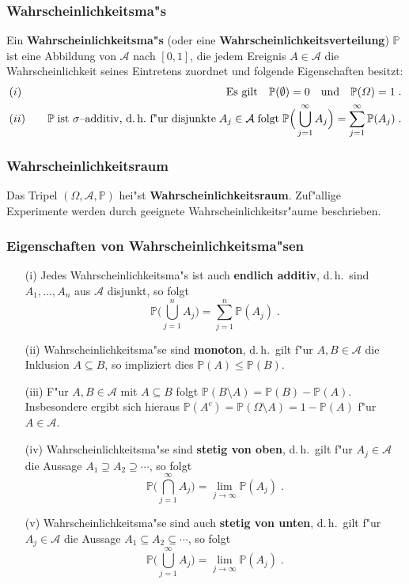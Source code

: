 \documentclass[ngerman,draft,parskip=half,twoside]{scrartcl}
\newcommand*{\Algeb}{\mathcal{A}}   %
\newcommand*{\WKM}{\mathbb{P}}      %
\begin{document}
\subsubsection{Wahrscheinlichkeitsma"s}
Ein \textbf{Wahrscheinlichkeitsma"s} (oder eine \textbf{Wahrscheinlichkeitsverteilung})
 $\WKM$ ist eine Abbildung von
$\Algeb$ nach $[0,1]$, die jedem Ereignis $A\in \Algeb$ die Wahrscheinlichkeit seines
Eintretens zuordnet und folgende Eigenschaften besitzt$\colon$
\begin{eqnarray*}
&(i)&\quad\mbox{Es gilt}\quad \WKM(\emptyset)=0\quad\mbox{und}\quad \WKM(\Omega)=1\;.\\
&(ii)&\quad
\WKM\;\mbox{ist $\sigma$--additiv, d.\,h.~f"ur disjunkte}\;A_j\in\Algeb\;\mbox{folgt}\;
\WKM\Big(\bigcup_{j=1}^\infty A_j\Big)=\sum_{j=1}^\infty\WKM(A_j)\;.
\end{eqnarray*}
\subsubsection{Wahrscheinlichkeitsraum}
Das Tripel $(\Omega,\Algeb,\WKM)$ hei"st \textbf{Wahrscheinlichkeitsraum}. Zuf"allige
Experimente werden durch geeignete Wahrscheinlichkeitsr"aume  beschrieben.
\subsubsection{Eigenschaften von Wahrscheinlichkeitsma"sen}
\begin{enumerate}
\item[\rm(i)]
Jedes Wahrscheinlichkeitsma"s ist auch \textbf{endlich additiv}, d.\,h.~sind
$A_1,\ldots,A_n$ aus $\Algeb$ disjunkt, so folgt
$$
\WKM\Big(\bigcup_{j=1}^n A_j\Big)=\sum_{j=1}^n\WKM(A_j)\;.
$$
\item[\rm(ii)]
Wahrscheinlichkeitsma"se sind \textbf{monoton}, d.\,h.~gilt f"ur $A,B\in\Algeb$ die Inklusion
$A\subseteq B$, so impliziert dies $\WKM(A)\le\WKM(B)$.
\item[\rm(iii)]
F"ur $A,B\in\Algeb$ mit $A\subseteq B$ folgt $\WKM(B\setminus A)=\WKM(B)-\WKM(A)$. Insbesondere ergibt sich hieraus
$\WKM(A^c)=\WKM(\Omega\setminus A)=1-\WKM(A)$ f"ur $A\in\Algeb$.
\item[\rm(iv)]
Wahrscheinlichkeitsma"se sind \textbf{stetig von oben}, d.\,h.~gilt f"ur $A_j\in\Algeb$
die Aussage $A_1\supseteq A_2\supseteq\cdots$,
so folgt
$$
\WKM\Big(\bigcap_{j=1}^\infty A_j\Big)=\lim_{j\to\infty}\WKM(A_j)\;.
$$
\item[\rm(v)]
Wahrscheinlichkeitsma"se sind auch \textbf{stetig von unten}, d.\,h.~gilt f"ur $A_j\in\Algeb$
die Aussage $A_1\subseteq A_2\subseteq\cdots$,
so folgt
$$
\WKM\Big(\bigcup_{j=1}^\infty A_j\Big)=\lim_{j\to\infty}\WKM(A_j)\;.
$$
\end{enumerate}
\end{document}
